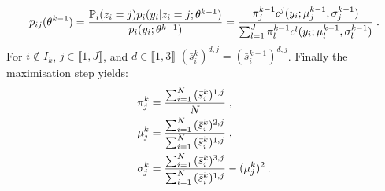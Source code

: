 \begin{exmp}
\begin{equation}\label{gmm:condexpect}
p_{ij}(\theta^{k-1}) =\frac{\mathbb{P}_i(z_i = j)p_i(y_i|z_i=j;\theta^{k-1})}{p_i(y_i; \theta^{k-1})}=\frac{\pi_j^{k-1} c^j(y_i;\mu^{k-1}_j,\sigma^{k-1}_j)}{\sum_{l=1}^{J}\pi_l^{k-1}c^l(y_i;\mu_l^{k-1}, \sigma_l^{k-1})}\;.
\end{equation}
For $i \notin I_k$, $j \in \llbracket 1, J \rrbracket$, and $d \in \llbracket 1,3 \rrbracket$ $(\bar{s}_i^k)^{d,j} = (\bar{s}_i^{k-1})^{d,j}$.
Finally the maximisation step yields:
\begin{align}
& \pi_j^k = \frac{\sum_{i=1}^{N}{(\bar{s}_i^k)^{1,j}}}{N}\;,\\
& \mu_j^k = \frac{\sum_{i=1}^{N}{(\bar{s}_i^k)^{2,j}}}{\sum_{i=1}^{N}{(\bar{s}_i^k)^{1,j}}} \;,\\
& \sigma_j^k = \frac{\sum_{i=1}^{N}{(\bar{s}_i^k)^{3,j}}}{\sum_{i=1}^{N}{(\bar{s}_i^k)^{1,j}}} - (\mu_j^k)^2\;.
\end{align}
\end{exmp}
